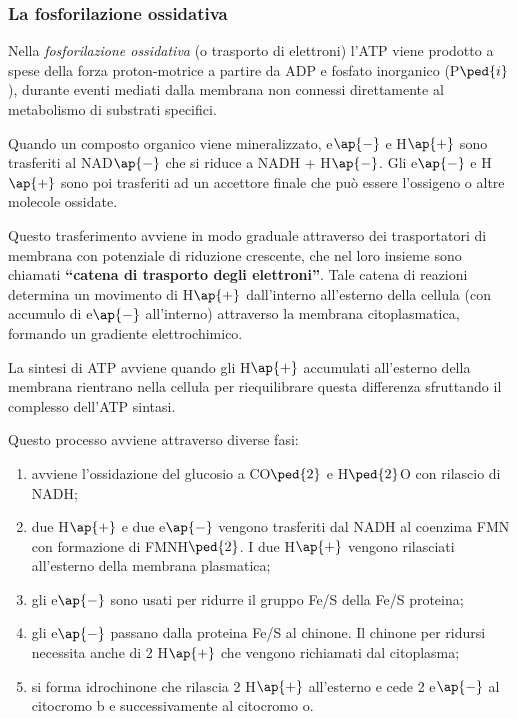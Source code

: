 \documentclass[11pt]{book}
\begin{document}
\subsubsection{La fosforilazione ossidativa}
Nella \emph{fosforilazione ossidativa} (o trasporto di elettroni) l’ATP viene prodotto a spese della forza proton-motrice a partire da ADP e fosfato inorganico (P$\ped{i}$), durante eventi mediati dalla membrana non connessi direttamente al metabolismo di substrati specifici.

\vspace{1em}
Quando un composto organico viene mineralizzato, e$\ap{-}$ e H$\ap{+}$ sono trasferiti al NAD$\ap{-}$ che si riduce a NADH + H$\ap{-}$. Gli e$\ap{-}$ e H$\ap{+}$ sono poi trasferiti ad un accettore finale che può essere l’ossigeno o altre molecole ossidate. 

Questo trasferimento avviene in modo graduale attraverso dei trasportatori di membrana con potenziale di riduzione crescente, che nel loro insieme sono chiamati \textbf{``catena di trasporto degli elettroni''}. Tale catena di reazioni determina un movimento di H$\ap{+}$ dall’interno all’esterno della cellula (con accumulo di e$\ap{-}$ all’interno) attraverso la membrana citoplasmatica, formando un gradiente elettrochimico. 

La sintesi di ATP avviene quando gli H$\ap{+}$ accumulati all’esterno della membrana rientrano nella cellula per riequilibrare questa differenza sfruttando il complesso dell’ATP sintasi.

Questo processo avviene attraverso diverse fasi:
\begin{enumerate}
\item avviene l'ossidazione del glucosio a CO$\ped{2}$ e H$\ped{2}$O con rilascio di NADH;
\item due H$\ap{+}$ e due e$\ap{-}$ vengono trasferiti dal NADH al coenzima FMN con formazione di FMNH$\ped{2}$. I due H$\ap{+}$ vengono rilasciati all’esterno della membrana plasmatica;
\item gli e$\ap{-}$ sono usati per ridurre il gruppo Fe/S della Fe/S proteina;
\item gli e$\ap{-}$ passano dalla proteina Fe/S al chinone. Il chinone per ridursi necessita anche di 2 H$\ap{+}$ che vengono richiamati dal citoplasma;
\item si forma idrochinone che rilascia 2 H$\ap{+}$ all’esterno e cede 2 e$\ap{-}$ al citocromo b e successivamente al citocromo o.
\end{enumerate}
\end{document}
